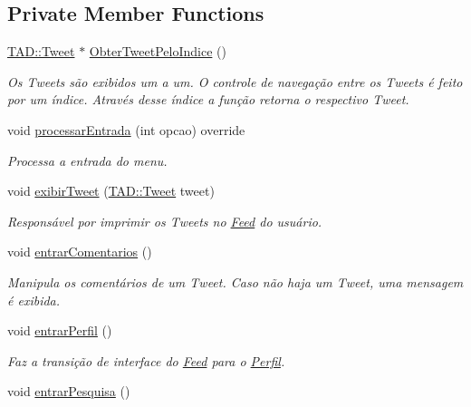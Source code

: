 \subsection*{Private Member Functions}
\begin{DoxyCompactItemize}
\item 
\hyperlink{class_t_a_d_1_1_tweet}{T\+A\+D\+::\+Tweet} $\ast$ \hyperlink{class_interface_1_1_feed_a4b11fd468df68a5c41dcb5cf2b8d637d}{Obter\+Tweet\+Pelo\+Indice} ()
\begin{DoxyCompactList}\small\item\em Os Tweets são exibidos um a um. O controle de navegação entre os Tweets é feito por um índice. Através desse índice a função retorna o respectivo Tweet. \end{DoxyCompactList}\item 
void \hyperlink{class_interface_1_1_feed_a16fbbeb11ad125e2633bb72b0c2ab4bf}{processar\+Entrada} (int opcao) override
\begin{DoxyCompactList}\small\item\em Processa a entrada do menu. \end{DoxyCompactList}\item 
void \hyperlink{class_interface_1_1_feed_a1b34847c7ee4f9df540a5246eedd0083}{exibir\+Tweet} (\hyperlink{class_t_a_d_1_1_tweet}{T\+A\+D\+::\+Tweet} tweet)
\begin{DoxyCompactList}\small\item\em Responsável por imprimir os Tweets no \hyperlink{class_interface_1_1_feed}{Feed} do usuário. \end{DoxyCompactList}\item 
void \hyperlink{class_interface_1_1_feed_a9367d3031cdd3a36818eff4d1f49b92c}{entrar\+Comentarios} ()
\begin{DoxyCompactList}\small\item\em Manipula os comentários de um Tweet. Caso não haja um Tweet, uma mensagem é exibida. \end{DoxyCompactList}\item 
void \hyperlink{class_interface_1_1_feed_a7cd09ff01bc220faeac98b0afdea1480}{entrar\+Perfil} ()
\begin{DoxyCompactList}\small\item\em Faz a transição de interface do \hyperlink{class_interface_1_1_feed}{Feed} para o \hyperlink{class_interface_1_1_perfil}{Perfil}. \end{DoxyCompactList}\item 
void \hyperlink{class_interface_1_1_feed_a75debf14bea8ae75c74599b117b8af5c}{entrar\+Pesquisa} ()

\end{DoxyCompactItemize}
